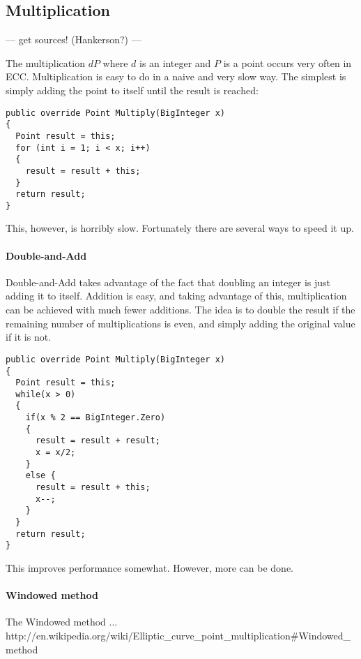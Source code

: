 \subsection{Multiplication}

--- get sources! (Hankerson?) ---

The multiplication \(dP\) where \(d\) is an integer and \(P\) is a point occurs very often in ECC. Multiplication
is easy to do in a naive and very slow way. The simplest is simply adding the point to itself until the result is
reached:

\begin{verbatim}
public override Point Multiply(BigInteger x)
{
  Point result = this;
  for (int i = 1; i < x; i++)
  {
    result = result + this;
  }
  return result;
}
\end{verbatim}

This, however, is horribly slow. Fortunately there are several ways to speed it up.

\paragraph{Double-and-Add}

Double-and-Add takes advantage of the fact that doubling an integer is just adding it to itself. Addition is easy,
and taking advantage of this, multiplication can be achieved with much fewer additions. The idea is to double the
result if the remaining number of multiplications is even, and simply adding the original value if it is not.

\begin{verbatim}
public override Point Multiply(BigInteger x)
{
  Point result = this;
  while(x > 0)
  {
    if(x % 2 == BigInteger.Zero)
    {
      result = result + result;
      x = x/2;
    }
    else {
      result = result + this;
      x--;
    }
  }
  return result;
}
\end{verbatim}

This improves performance somewhat. However, more can be done.

\paragraph{Windowed method}

The Windowed method ... http://en.wikipedia.org/wiki/Elliptic_curve_point_multiplication#Windowed_method